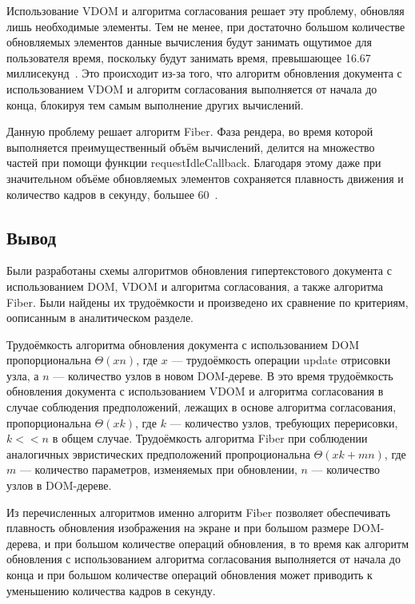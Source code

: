 Использование VDOM и алгоритма согласования решает эту проблему, обновляя лишь необходимые элементы. Тем не менее, при достаточно большом количестве обновляемых элементов данные вычисления будут занимать ощутимое для пользователя время, поскольку будут занимать время, превышающее 16.67 миллисекунд~\cite{react-dive}. Это происходит из-за того, что алгоритм обновления документа с использованием VDOM и алгоритм согласования выполняется от начала  до конца, блокируя тем самым выполнение других вычислений.

Данную проблему решает алгоритм Fiber. Фаза рендера, во время которой выполняется преимущественный объём вычислений, делится на множество частей при помощи функции requestIdleCallback. Благодаря этому даже при значительном объёме обновляемых элементов сохраняется плавность движения и количество кадров в секунду, большее 60~\cite{react-dive}.
\subsection*{Вывод}

Были разработаны схемы алгоритмов обновления гипертекстового документа с использованием DOM, VDOM и алгоритма согласования, а также алгоритма Fiber. Были найдены их трудоёмкости и произведено их сравнение по критериям, оописанным в аналитическом разделе.

Трудоёмкость алгоритма обновления документа с использованием DOM пропорциональна $\Theta(xn)$, где $x$ --- трудоёмкость операции update отрисовки узла, а $n$ --- количество узлов в новом DOM-дереве.
В это время трудоёмкость обновления документа с использованием VDOM и алгоритма согласования в случае соблюдения предположений, лежащих в основе алгоритма согласования, пропорциональна $\Theta(xk)$, где $k$ --- количество узлов, требующих перерисовки, $k << n$ в общем случае.
Трудоёмкость алгоритма Fiber при соблюдении аналогичных эвристических предположений пропроциональна $\Theta(xk + mn)$, где $m$ --- количество параметров, изменяемых при обновлении, $n$ --- количество узлов в DOM-дереве.

Из перечисленных алгоритмов именно алгоритм Fiber позволяет обеспечивать плавность обновления изображения на экране и при большом размере DOM-дерева, и при большом количестве операций обновления, в то время как алгоритм обновления с использованием алгоритма согласования выполняется от начала до конца и при большом количестве операций обновления может приводить к уменьшению количества кадров в секунду.
\pagebreak